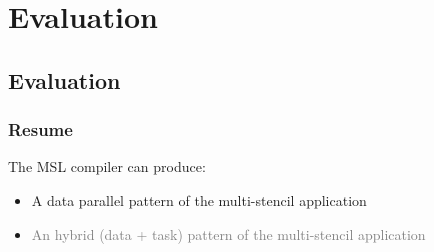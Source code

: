 \documentclass{beamer}
\begin{document}

 



\section{Evaluation}
\subsection{Evaluation}

\begin{frame}
\frametitle{Resume}
The MSL compiler can produce:
\begin{itemize}
\item A data parallel pattern of the multi-stencil application
\item \textcolor{gray}{An hybrid (data + task) pattern of the multi-stencil application}
\end{itemize}
\end{frame}
\end{document}
